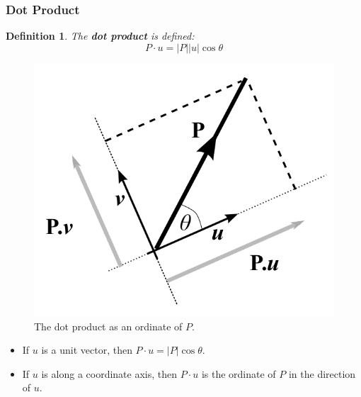 \documentclass[11pt]{article}
\newtheorem{defn}{Definition}
\begin{document}
\subsubsection{Dot Product}
\begin{defn}
  The \textbf{dot product} is defined:
  \[
    P \cdot u = \lvert P \rvert \lvert u \rvert \cos \theta  
  \]
\end{defn}

\begin{figure}[htb!]
  \caption{The dot product as an ordinate of $P$.}
  \includegraphics[scale=0.2]{dotproduct}
  \centering
\end{figure}

\begin{itemize}
  \item If $u$ is a unit vector, then $P \cdot u = \lvert P \rvert \cos \theta$.
  \item If $u$ is along a coordinate axis, then $P \cdot u$ is the ordinate of $P$ in the direction of $u$.
\end{itemize}
\end{document}
